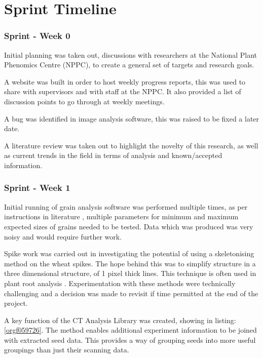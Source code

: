 \documentclass[11pt]{report}
\begin{document}
\chapter{Sprint Timeline}
\label{sec:org9cdc406}
\label{org8882545}

\subsection{Sprint - Week 0}
\label{sec:org4c4248e}
Initial planning was taken out, discussions with researchers at the National Plant Phenomics Centre (NPPC), to create a general set of targets and research goals.

A website was built in order to host weekly progress reports, this was used to share with supervisors and with staff at the NPPC. It also provided a list of discussion points to go through at weekly meetings.

A bug was identified in image analysis software, this was raised to be fixed a later date.

A literature review was taken out to highlight the novelty of this research, as well as current trends in the field in terms of analysis and known/accepted information.

\subsection{Sprint - Week 1}
\label{sec:orgd08cf70}

Initial running of grain analysis software was performed multiple times, as per instructions in literature \cite{Hughes2017}, multiple parameters for minimum and maximum expected sizes of grains needed to be tested. Data which was produced was very noisy and would require further work.

Spike work was carried out in investigating the potential of using a skeletonising method on the wheat spikes. The hope behind this was to simplify structure in a three dimensional structure, of 1 pixel thick lines. This technique is often used in plant root analysis \cite{Mairhofer2015,Daly2017}. Experimentation with these methods were technically challenging and a decision was made to revisit if time permitted at the end of the project.

A key function of the CT Analysis Library was created, showing in listing:\ref{orgf059726}. The method enables additional experiment information to be joined with extracted seed data. This provides a way of grouping seeds into more useful groupings than just their scanning data.
\end{document}
